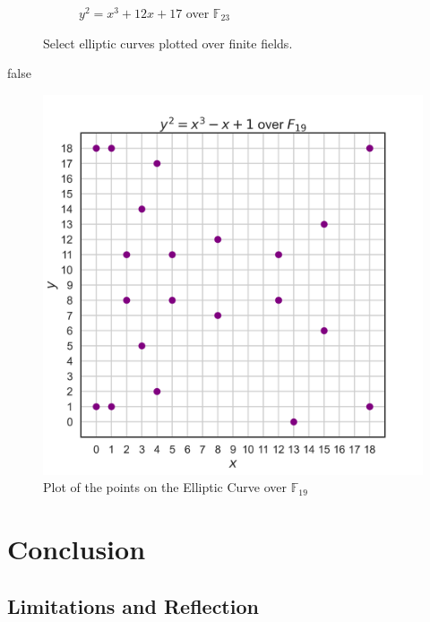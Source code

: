 \documentclass[11pt, a4paper]{report}
\newcommand{\field}{\mathbb{F}}
\begin{document}
\begin{figure}[ht]
\begin{subfigure}{0.49\textwidth}
\caption{$y^2 = x^3 + 12x + 17$ over $\field_{23}$}
\label{fig:right}
\end{subfigure}
\caption{Select elliptic curves plotted over finite fields.}
\label{fig:combined}
\end{figure}

\if false
\begin{figure}[ht]
\begin{center}
\includegraphics[width=\linewidth]{krationalpoints.png} 
\caption{Plot of the points on the Elliptic Curve over $\mathbb{F}_{19}$}
\label{fig:krational}
\end{center}
\end{figure}
\fi

\section{Conclusion}
\subsection{Limitations and Reflection}



\newpage 

\printbibliography
\end{document}
